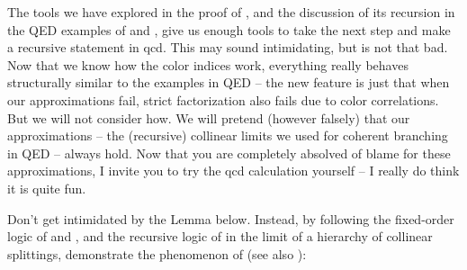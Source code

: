 The tools we have explored in the proof of , and the discussion of its recursion in the QED examples of  and , give us enough tools to take the next step and make a recursive statement in \gls{qcd}.
%
This may sound intimidating, but is not that bad.
%
Now that we know how the color indices work, everything really behaves structurally similar to the examples in QED -- the new feature is just that when our approximations fail, strict factorization also fails due to color correlations.
%
But we will not consider how.
%
We will pretend (however falsely) that our approximations -- the (recursive) collinear limits we used for coherent branching in QED -- always hold.
%
Now that you are completely absolved of blame for these approximations, I invite you to try the \gls{qcd} calculation yourself -- I really do think it is quite fun.

\begin{exercise}
    \label{ex:qcd-coherent-branching-proof}
    Don't get intimidated by the Lemma below.
    Instead, by following the fixed-order logic of  and , and the recursive logic of  in the limit of a hierarchy of collinear splittings, demonstrate the phenomenon of  (see also ):
\end{exercise}


